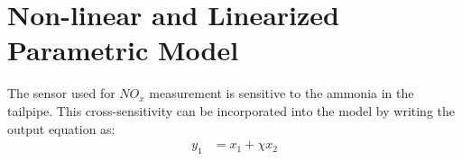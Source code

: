 
\section{Non-linear and Linearized Parametric Model}

The sensor used for $NO_x$ measurement is sensitive to the ammonia in the
tailpipe. This cross-sensitivity can be incorporated into the model by writing
the output equation as:
\begin{align*}
    y_1 &= x_1 + \chi x_2\\
\end{align*}

